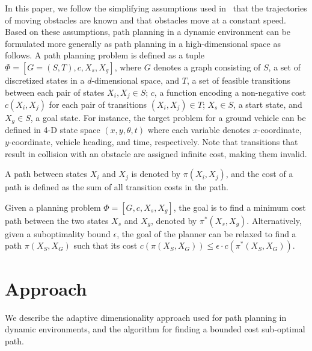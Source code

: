 In this paper, we follow the simplifying assumptions used in~\cite{phillips2011sipp} that the trajectories of moving obstacles are known and that obstacles move at a constant speed. Based on these assumptions, path planning in a dynamic environment can be formulated more generally as path planning in a high-dimensional space as follows. A path planning problem is defined as a tuple $\Phi = [G = (S, T), c, X_{s}, X_{g}]$, where $G$ denotes a graph consisting of $S$, a set of discretized states in a $d$-dimensional space, and $T$, a set of feasible transitions between each pair of states $X_i, X_j \in S$; $c$, a function encoding a non-negative cost $c(X_i,X_j)$ for each pair of transitions $(X_i,X_j) \in T$; $X_{s} \in S$, a start state, and $X_{g} \in S$, a goal state. For instance, the target problem for a ground vehicle can be defined in 4-D state space $(x, y, \theta, t)$ where each variable denotes $x$-coordinate, $y$-coordinate, vehicle heading, and time, respectively. Note that transitions that result in collision with an obstacle are assigned infinite cost, making them invalid. 

A path between states $X_i$ and $X_j$ is denoted by $\pi(X_i,X_j)$, and the cost of a path is defined as the sum of all transition costs in the path. 

Given a planning problem $\Phi = [G, c, X_{s}, X_{g}]$, the goal is to find a minimum cost path between the two states $X_{s}$ and $X_{g}$, denoted by $\pi^*(X_s,X_g)$. 
Alternatively, given a suboptimality bound $\epsilon$, the goal of the planner can be relaxed to find a path $\pi(X_S,X_G)$ such that its cost $c(\pi(X_S,X_G)) \leq \epsilon \cdot c(\pi^*(X_S,X_G))$.

\section{Approach}\label{sec:ppad-approach}

We describe the adaptive dimensionality approach used for path planning in dynamic environments, and the algorithm for finding a bounded cost sub-optimal path.

